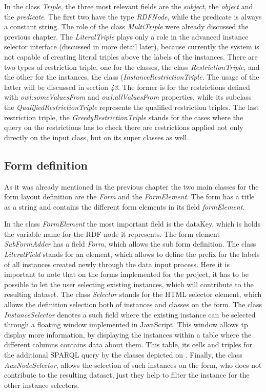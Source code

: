 In the class \textit{Triple}, the three most relevant fields are the \textit{subject}, the \textit{object} and the \textit{predicate}. The first two have the type \textit{RDFNode}, while the predicate is always a constant string. The role of the class \textit{MultiTriple} were already discussed the previous chapter. The \textit{LiteralTriple} plays only a role in the advanced instance selector interface (discussed in more detail later), because currently the system is not capable of creating literal triples above the labels of the instances. There are two types of restriction triple, one for the classes, the class \textit{RestrictionTriple}, and the other for the instances, the class (\textit{InstanceRestrictionTriple}. The usage of the latter will be discussed in section \textit{43}. The former is for the restrictions defined with \textit{owl:someValuesFrom} and \textit{owl:allValuesFrom} properties, while its subclass the \textit{QualifiedRestrictionTriple} represents the qualified restriction triples. The last restriction triple, the \textit{GreedyRestrictionTriple} stands for the cases where the query on the restrictions has to check there are restrictions applied not only directly on the input class, but on its super classes as well.

\subsection{Form definition}

As it was already mentioned in the previous chapter the two main classes for the form layout definition are the \textit{Form} and the \textit{FormElement}. The form has a title as a string and contains the different form elements in its field \textit{formElement}. 


In the class \textit{FormElement} the most important field is the dataKey, which is holds the variable name for the RDF node it represents. The form element \textit{SubFormAdder} has a field \textit{Form}, which allows the sub form definition. The class \textit{LiteralField} stands for an element, which allows to define the prefix for the labels of all instances created newly through the data input process. Here it is important to note that on the forms implemented for the project, it has to be possible to let the user selecting existing instances, which will contribute to the resulting dataset. The class \textit{Selector} stands for the HTML selector element, which allows the definition selection both of instances and classes on the form. The class \textit{InstanceSelector} denotes a such field where the existing instance can be selected through a floating window implemented in JavaScript. This window allows tp display more information, by displaying the instances within a table where the different columns contains data about them. This table, its cells and triples for the additional SPARQL query by the classes depicted on . Finally, the class \textit{AuxNodeSelector}, allows the selection of such instances on the form, who does not contribute to the resulting dataset, just they help to filter the instance for the other instance selectors.

